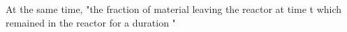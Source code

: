 At the same time, "the fraction of material leaving the reactor at time t which remained in the reactor for a duration "  